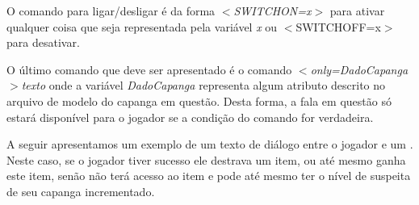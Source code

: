 O comando para ligar/desligar é da forma \emph{$<$SWITCHON=x$>$} para ativar qualquer coisa que seja representada pela variável \emph{x} ou {$<$SWITCHOFF=x$>$} para desativar.

O último comando que deve ser apresentado é o comando \emph{$<$only=DadoCapanga$>$texto} onde a variável \emph{DadoCapanga} representa algum atributo descrito no arquivo de modelo do capanga em questão. Desta forma, a fala em questão só estará disponível para o jogador se a condição do comando for verdadeira.

A seguir apresentamos um exemplo de um texto de diálogo entre o jogador e um \npc{}. Neste caso, se o jogador tiver sucesso ele destrava um item, ou até mesmo ganha este item, senão não terá acesso ao item e pode até mesmo ter o nível de suspeita de seu capanga incrementado.

